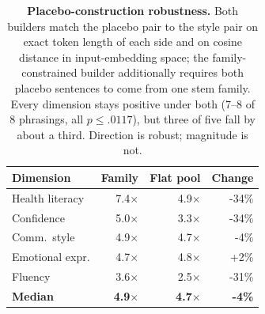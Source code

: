 \begin{table}[t]\centering\small
\begin{tabular}{@{}lrrr@{}}
\toprule
Dimension & Family & Flat pool & Change \\
\midrule
Health literacy & 7.4$\times$ & 4.9$\times$ & -34\% \\
Confidence & 5.0$\times$ & 3.3$\times$ & -34\% \\
Comm.\ style & 4.9$\times$ & 4.7$\times$ & -4\% \\
Emotional expr. & 4.7$\times$ & 4.8$\times$ & +2\% \\
Fluency & 3.6$\times$ & 2.5$\times$ & -31\% \\
\midrule
\textbf{Median} & \textbf{4.9$\times$} & \textbf{4.7$\times$} & \textbf{-4\%} \\
\bottomrule
\end{tabular}
\caption{\textbf{Placebo-construction robustness.} Both builders match the placebo pair to the style pair on
exact token length of each side and on cosine distance in input-embedding space; the family-constrained
builder additionally requires both placebo sentences to come from one stem family. Every dimension stays
positive under both (7--8 of 8 phrasings, all $p \le .0117$), but three of five fall by about a third.
Direction is robust; magnitude is not.}
\label{tab:placebo}
\end{table}
